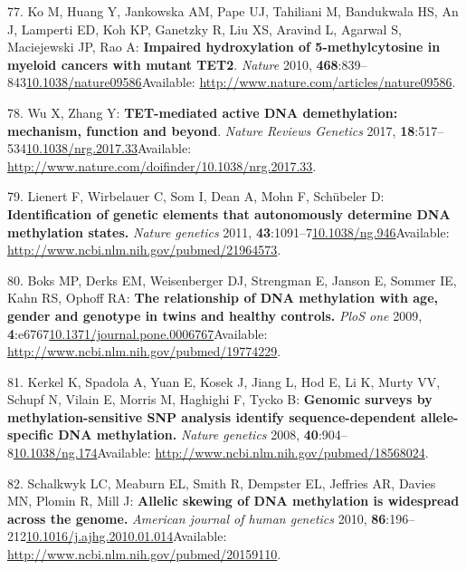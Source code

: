\documentclass[
]{book}
\begin{document}
\leavevmode\hypertarget{ref-Ko2010a}{}%
77. Ko M, Huang Y, Jankowska AM, Pape UJ, Tahiliani M, Bandukwala HS, An J, Lamperti ED, Koh KP, Ganetzky R, Liu XS, Aravind L, Agarwal S, Maciejewski JP, Rao A: \textbf{Impaired hydroxylation of 5-methylcytosine in myeloid cancers with mutant TET2}. \emph{Nature} 2010, \textbf{468}:839--843\href{https://doi.org/10.1038/nature09586}{10.1038/nature09586}Available: \url{http://www.nature.com/articles/nature09586}.

\leavevmode\hypertarget{ref-Wu2017}{}%
78. Wu X, Zhang Y: \textbf{TET-mediated active DNA demethylation: mechanism, function and beyond}. \emph{Nature Reviews Genetics} 2017, \textbf{18}:517--534\href{https://doi.org/10.1038/nrg.2017.33}{10.1038/nrg.2017.33}Available: \url{http://www.nature.com/doifinder/10.1038/nrg.2017.33}.

\leavevmode\hypertarget{ref-Lienert2011}{}%
79. Lienert F, Wirbelauer C, Som I, Dean A, Mohn F, Schübeler D: \textbf{Identification of genetic elements that autonomously determine DNA methylation states.} \emph{Nature genetics} 2011, \textbf{43}:1091--7\href{https://doi.org/10.1038/ng.946}{10.1038/ng.946}Available: \url{http://www.ncbi.nlm.nih.gov/pubmed/21964573}.

\leavevmode\hypertarget{ref-Boks2009}{}%
80. Boks MP, Derks EM, Weisenberger DJ, Strengman E, Janson E, Sommer IE, Kahn RS, Ophoff RA: \textbf{The relationship of DNA methylation with age, gender and genotype in twins and healthy controls.} \emph{PloS one} 2009, \textbf{4}:e6767\href{https://doi.org/10.1371/journal.pone.0006767}{10.1371/journal.pone.0006767}Available: \url{http://www.ncbi.nlm.nih.gov/pubmed/19774229}.

\leavevmode\hypertarget{ref-Kerkel2008}{}%
81. Kerkel K, Spadola A, Yuan E, Kosek J, Jiang L, Hod E, Li K, Murty VV, Schupf N, Vilain E, Morris M, Haghighi F, Tycko B: \textbf{Genomic surveys by methylation-sensitive SNP analysis identify sequence-dependent allele-specific DNA methylation.} \emph{Nature genetics} 2008, \textbf{40}:904--8\href{https://doi.org/10.1038/ng.174}{10.1038/ng.174}Available: \url{http://www.ncbi.nlm.nih.gov/pubmed/18568024}.

\leavevmode\hypertarget{ref-Schalkwyk2010}{}%
82. Schalkwyk LC, Meaburn EL, Smith R, Dempster EL, Jeffries AR, Davies MN, Plomin R, Mill J: \textbf{Allelic skewing of DNA methylation is widespread across the genome.} \emph{American journal of human genetics} 2010, \textbf{86}:196--212\href{https://doi.org/10.1016/j.ajhg.2010.01.014}{10.1016/j.ajhg.2010.01.014}Available: \url{http://www.ncbi.nlm.nih.gov/pubmed/20159110}.
\end{document}
